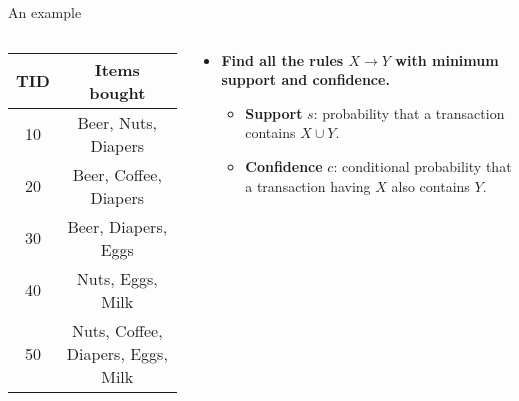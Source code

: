 \documentclass[aspectratio=169,t]{beamer}
\begin{document}
  { 
    \begin{frame}{An example}
        \begin{columns}
          \begin{column}{0.4\textwidth}
          \begin{tabular}{|c|c|}
          \hline
          \textbf{TID} & \textbf{Items bought}\\\hline
          10 & Beer, Nuts, Diapers \\\hline
          20 & Beer, Coffee, Diapers \\\hline
          30 & Beer, Diapers, Eggs \\\hline
          40 & Nuts, Eggs, Milk \\\hline
          50 & Nuts, Coffee, Diapers, Eggs, Milk\\\hline
          \end{tabular}
          \end{column}
          \begin{column}{0.5\textwidth}
          \vspace{-2cm}
          \begin{itemize}
            \item \textbf{Find all the rules $X \rightarrow Y$ with minimum support and confidence.}
            \begin{itemize}
              \item \textbf{Support} $s$: probability that a transaction contains $X \cup Y$.
              \item \textbf{Confidence} $c$: conditional probability that a transaction having $X$ also contains $Y$.
            \end{itemize}

\end{itemize}
\end{column}
\end{columns}
\end{frame}}
\end{document}
